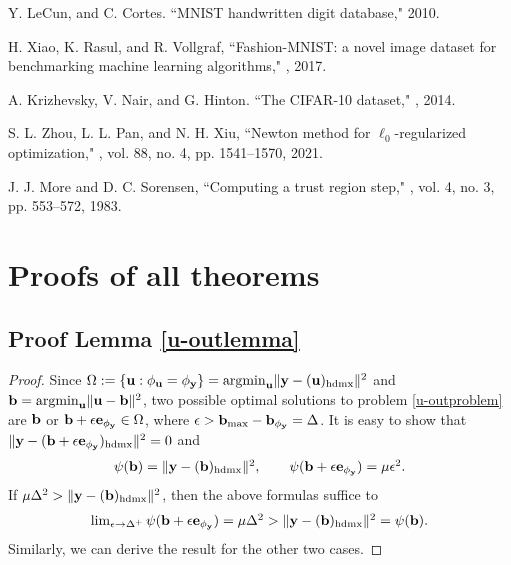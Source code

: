 \documentclass[journal]{IEEEtran}
\def\b{{\bf b}}
\def\e{{\bf e}}
\def\hd{{\rm hdmx}}
\def\u{{\bf u}}
\def\y{{\bf y}}
\begin{document}
\begin{thebibliography}{99}
Y. LeCun, and C. Cortes.
\newblock  ``MNIST handwritten digit database," 2010.


H. Xiao, K. Rasul, and R. Vollgraf,
\newblock  ``Fashion-MNIST: a novel image dataset for benchmarking machine learning algorithms,"
, 2017.

 A. Krizhevsky, V. Nair, and G. Hinton.
\newblock  ``The CIFAR-10 dataset,"
, 2014.

S. L. Zhou, L. L. Pan, and N. H. Xiu,
\newblock  ``Newton method for $\ell_0$-regularized optimization,"
,
\newblock vol. 88, no. 4, pp. 1541--1570, 2021.


J. J. More and D. C. Sorensen,
\newblock  ``Computing a trust region step,"
, vol. 4, no. 3, pp. 553--572, 1983.

\end{thebibliography}

\newpage
\onecolumn
\appendices
 \section{Proofs of all theorems}
\subsection{Proof Lemma \ref{u-outlemma}}
\begin{proof}
Since  $\Omega:=\{\u: \phi_\u=\phi_\y\}={\rm argmin}_\u \|\y- (\u)_\hd\|^{2}$ and   $\b= {\rm argmin}_\u\|\u-\b\|^2$, two possible optimal solutions to problem \eqref{u-outproblem} are $\b$ or $\b+\epsilon \e_{\phi_\y}\in\Omega$, where $\epsilon> \b_{\max}-\b_{\phi_\y}=\Delta$. It is easy to show that $ \|\y-(\b+\epsilon \e_{\phi_\y})_\hd \|^2=0$ and
\begin{eqnarray*}
\begin{array}{lll}
\psi(\b)=\|\y-(\b)_\hd \|^2, \qquad \psi(\b+\epsilon \e_{\phi_\y})=\mu \epsilon^2.
\end{array}
\end{eqnarray*}
If $\mu \Delta^2 > \|\y-(\b)_\hd \|^2$, then the above formulas suffice to
\begin{eqnarray}
\begin{array}{lll}
\lim_{\epsilon\to\Delta^+} \psi(\b+\epsilon \e_{\phi_\y})=\mu\Delta^2 > \|\y-(\b)_\hd \|^2=
\psi(\b).
\end{array}
\end{eqnarray}
Similarly, we can derive the result for the other two cases.
\end{proof}
\end{document}
